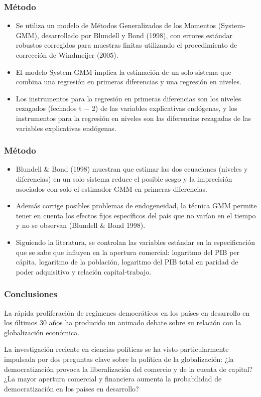 \documentclass{beamer}
\begin{document}
\begin{frame}
\frametitle{Método}
\begin{itemize}
\item Se utiliza un modelo de Métodos Generalizados de los Momentos (System-GMM), desarrollado por Blundell y Bond (1998), con errores estándar robustos corregidos para muestras finitas utilizando el procedimiento de corrección de Windmeijer (2005). 
\item El modelo System-GMM implica la estimación de un solo sistema que combina una regresión en primeras diferencias y una regresión en niveles. 
\item Los instrumentos para la regresión en primeras diferencias son los niveles rezagados (fechados t − 2) de las variables explicativas endógenas, y los instrumentos para la regresión en niveles son las diferencias rezagadas de las variables explicativas endógenas. 
\end{itemize}
\end{frame}

\begin{frame}
\frametitle{Método}
\begin{itemize}
\item Blundell & Bond (1998) muestran que estimar las dos ecuaciones (niveles y diferencias) en un solo sistema reduce el posible sesgo y la imprecisión asociados con solo el estimador GMM en primeras diferencias. 
\item Además corrige posibles problemas de endogeneidad, la técnica GMM permite tener en cuenta los efectos fijos específicos del país que no varían en el tiempo y no se observan (Blundell & Bond 1998). 
\item Siguiendo la literatura, se controlan las variables estándar en la especificación que se sabe que influyen en la apertura comercial: logaritmo del PIB per cápita, logaritmo de la población, logaritmo del PIB total en paridad de poder adquisitivo y relación capital-trabajo.
\end{itemize}
\end{frame}


\begin{frame}
\frametitle{Conclusiones}
La rápida proliferación de regímenes democráticos en los países en desarrollo en los últimos 30 años ha producido un animado debate sobre su relación con la globalización económica.

La investigación reciente en ciencias políticas se ha visto particularmente impulsada por dos preguntas clave sobre la política de la globalización: ¿la democratización provoca la liberalización del comercio y de la cuenta de capital? ¿La mayor apertura comercial y financiera aumenta la probabilidad de democratización en los países en desarrollo?

\end{frame}
\end{document}
